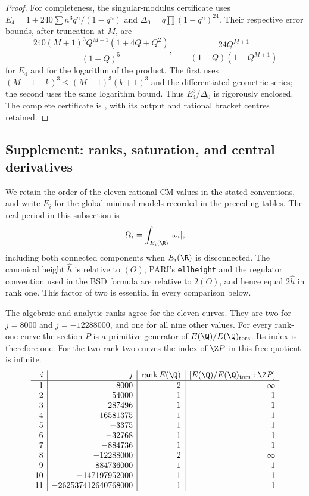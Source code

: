 \begin{proof}
For completeness, the singular-modulus certificate uses
$E_4=1+240\sum n^3q^n/(1-q^n)$ and
$\Delta_0=q\prod(1-q^n)^{24}$. Their respective error
bounds, after truncation at $M$, are
\[
 \frac{240(M+1)^3Q^{M+1}(1+4Q+Q^2)}{(1-Q)^5},
 \qquad
 \frac{24Q^{M+1}}{(1-Q)(1-Q^{M+1})}
\]
for $E_4$ and for the logarithm of the product. The first
uses $(M+1+k)^3\le(M+1)^3(k+1)^3$ and the differentiated
geometric series; the second uses the same logarithm bound.
Thus $E_4^3/\Delta_0$ is rigorously enclosed. The complete
certificate is , with its
output and rational bracket centres retained.
\end{proof}


\subsection{Supplement: ranks, saturation, and central derivatives}

We retain the order of the eleven rational CM values in the stated conventions, and
write $E_i$ for the global minimal models recorded in the preceding
tables. The real period in this subsection is
\[
 \Omega_i=\int_{E_i(\R)}|\omega_i|,
\]
including both connected components when $E_i(\R)$ is disconnected.
The canonical height $\widehat h$ is relative to $(O)$; PARI's
\texttt{ellheight} and the regulator convention used in the BSD formula
are relative to $2(O)$, and hence equal $2\widehat h$ in rank one.
This factor of two is essential in every comparison below.

\begin{proposition}\label{ari:C.6.R1}
The algebraic and analytic ranks agree for the eleven curves. They are
two for $j=8000$ and $j=-12288000$, and one for all nine other values.
For every rank-one curve the section $P$ is a primitive generator of
$E(\Q)/E(\Q)_{\rm tors}$. Its index is therefore one. For the two
rank-two curves the index of $\Z P$ in this free quotient is infinite.
\[
\begin{array}{r|r|r|r}
i&j&\operatorname{rank}E(\Q)&[E(\Q)/E(\Q)_{\rm tors}:\Z P]\\\hline
1&8000&2&\infty\\
2&54000&1&1\\
3&287496&1&1\\
4&16581375&1&1\\
5&-3375&1&1\\
6&-32768&1&1\\
7&-884736&1&1\\
8&-12288000&2&\infty\\
9&-884736000&1&1\\
10&-147197952000&1&1\\
11&-262537412640768000&1&1
\end{array}
\]
\end{proposition}

